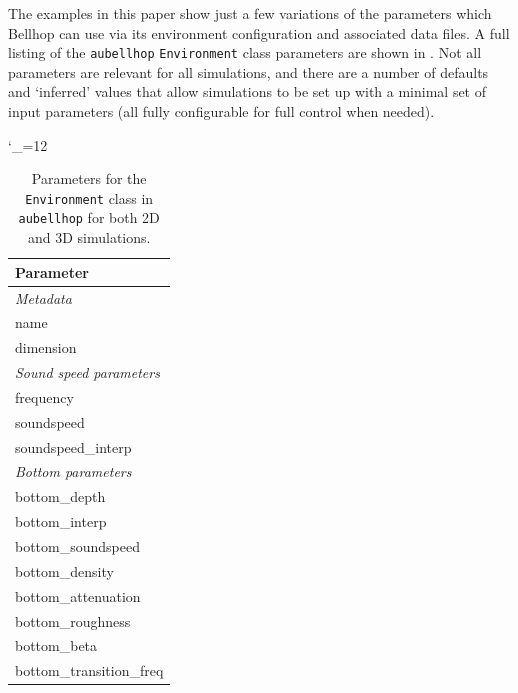 \documentclass{internoise2026-wr}
\begin{document}
The examples in this paper show just a few variations of the parameters which Bellhop can use via its environment configuration and associated data files. A full listing of the \texttt{aubellhop} \texttt{Environment} class parameters are shown in . Not all parameters are relevant for all simulations, and there are a number of defaults and `inferred' values that allow simulations to be set up with a minimal set of input parameters (all fully configurable for full control when needed).

\begin{table}
\catcode`\_=12\relax
\def\MIDTITLE#1{\midrule\normalfont\emph{\ignorespaces #1}}
\footnotesize\ttfamily\centering
\caption{Parameters for the \texttt{Environment} class in \texttt{aubellhop} for both 2D and 3D simulations.}
\begin{minipage}[t]{0.4\textwidth}\centering
\begin{tabular}[t]{l}
		\toprule
		\normalfont\textbf{Parameter} \\
    \MIDTITLE{ Metadata}            \\
    name                                                \\
    dimension                                           \\
    \MIDTITLE{ Sound speed parameters}            \\
    frequency                                           \\
    soundspeed                                          \\
    soundspeed_interp                                   \\
    \MIDTITLE{ Bottom parameters}            \\
    bottom_depth                                        \\
    bottom_interp                                       \\
    bottom_soundspeed                                   \\
    bottom_density                                      \\
    bottom_attenuation                                  \\
    bottom_roughness                                    \\
    bottom_beta                                         \\
    bottom_transition_freq                              \\

\end{tabular}
\end{minipage}
\end{table}
\end{document}
